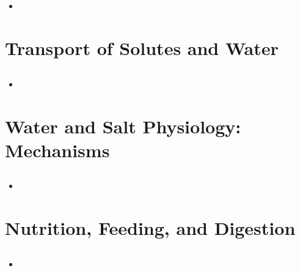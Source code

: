 \documentclass[12pt,a4paper]{article}
\begin{document}
\subsection{}
\begin{itemize}
    \item 
\end{itemize}

\clearpage
\section{Transport of Solutes and Water}
\subsection{}
\begin{itemize}
    \item 
\end{itemize}

\clearpage
\setcounter{section}{26}
\section{Water and Salt Physiology: Mechanisms}
\subsection{}
\begin{itemize}
    \item 
\end{itemize}

\clearpage
\setcounter{section}{6}
\section{Nutrition, Feeding, and Digestion}
\subsection{}
\begin{itemize}
    \item 
\end{itemize}

\clearpage
{}

\end{document}
